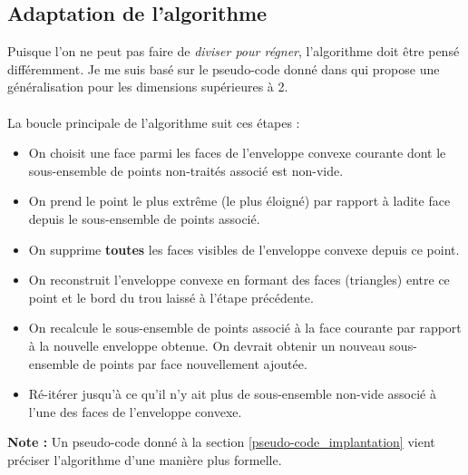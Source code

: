 \documentclass[]{article}
\begin{document}
\subsection{Adaptation de l'algorithme}

Puisque l'on ne peut pas faire de \emph{diviser pour régner}, l'algorithme doit être pensé différemment. Je me suis basé sur le pseudo-code donné dans \cite{10.1145/235815.235821} qui propose une généralisation pour les dimensions supérieures à 2.

\paragraph{}
La boucle principale de l'algorithme suit ces étapes :
\begin{itemize}
	\item On choisit une face parmi les faces de l'enveloppe convexe courante dont le sous-ensemble de points non-traités associé est non-vide.
	\item On prend le point le plus extrême (le plus éloigné) par rapport à ladite face depuis le sous-ensemble de points associé.
	\item On supprime \textbf{toutes} les faces visibles de l'enveloppe convexe depuis ce point.
	\item On reconstruit l'enveloppe convexe en formant des faces (triangles) entre ce point et le bord du trou laissé à l'étape précédente.
	\item On recalcule le sous-ensemble de points associé à la face courante par rapport à la nouvelle enveloppe obtenue. On devrait obtenir un nouveau sous-ensemble de points par face nouvellement ajoutée.
	\item Ré-itérer jusqu'à ce qu'il n'y ait plus de sous-ensemble non-vide associé à l'une des faces de l'enveloppe convexe.
\end{itemize}
\textbf{Note :} Un pseudo-code donné à la section \ref{pseudo-code_implantation} vient préciser l'algorithme d'une manière plus formelle.
\end{document}
